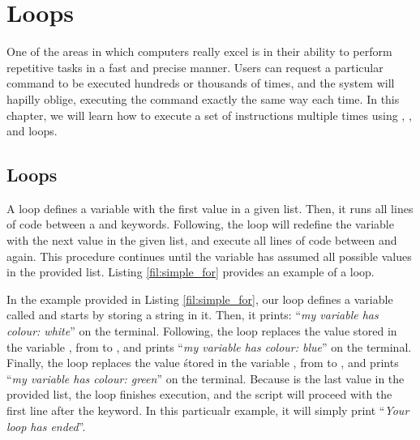 \chapter{Loops}\label{ch:loops}

One of the areas in which computers really excel is in their ability to perform repetitive tasks in a fast and precise manner. Users can request a particular command to be executed hundreds or thousands of times, and the system will hapilly oblige, executing the command exactly the same way each time. In this chapter, we will learn how to execute a set of instructions multiple times using , , and  loops. 

\section{ Loops}

A  loop defines a variable with the first value in a given list. Then,  it runs all lines of code between a  and  keywords. Following, the loop will redefine the variable with the next value in the given list, and execute all lines of code between  and  again. This procedure continues until the variable has assumed all possible values in the provided list. Listing \ref{fil:simple_for} provides an example of a  loop.

In the example provided in Listing \ref{fil:simple_for}, our loop defines a variable called  and starts by storing a string  in it. Then, it prints: ``\textit{my variable has colour: white}'' on the terminal. Following, the loop replaces the value stored in the variable , from  to , and prints ``\textit{my variable has colour: blue}'' on the terminal. Finally, the loop replaces the value śtored in the variable , from  to , and prints ``\textit{my variable has colour: green}'' on the terminal. Because  is the last value in the provided list, the loop finishes execution, and the script will proceed with the first line after the  keyword. In this particualr example, it will simply print ``\textit{Your loop has ended}''.
